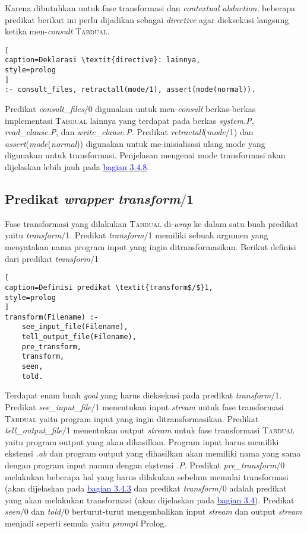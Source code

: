 Karena dibutuhkan untuk fase transformasi dan \textit{contextual abduction}, beberapa predikat berikut ini perlu dijadikan sebagai \textit{directive} agar dieksekusi langsung ketika men-\textit{consult} \textsc{Tabdual}.
\\

\begin{lstlisting}[
caption=Deklarasi \textit{directive}: lainnya,
style=prolog
]
:- consult_files, retractall(mode/1), assert(mode(normal)).
\end{lstlisting}

Predikat \textit{consult\_files$/$}0 digunakan untuk men-\textit{consult} berkas-berkas implementasi \textsc{Tabdual} lainnya yang terdapat pada berkas \textit{system.P}, \textit{read\_clause.P}, dan \textit{write\_clause.P}. Predikat \textit{retractall}(\textit{mode$/$}1) dan \textit{assert}(\textit{mode}(\textit{normal})) digunakan untuk me-inisialisasi ulang mode yang digunakan untuk transformasi. Penjelasan mengenai mode transformasi akan dijelaskan lebih jauh pada \hyperref[subsec:mode]{\textcolor{blue}{bagian 3.4.8}}.

\subsection{Predikat \textit{wrapper} \textit{transform$/$}1}

Fase transformasi yang dilakukan \textsc{Tabdual} di-\textit{wrap} ke dalam satu buah predikat yaitu \textit{transform$/$}1. Predikat \textit{transform$/$}1 memiliki sebuah argumen yang menyatakan nama program input yang ingin ditransformasikan. Berikut definisi dari predikat \textit{transform$/$}1
\\

\begin{lstlisting}[
caption=Definisi predikat \textit{transform$/$}1,
style=prolog
]
transform(Filename) :-
	see_input_file(Filename),
	tell_output_file(Filename),
	pre_transform,
	transform,
	seen,
	told.
\end{lstlisting}

Terdapat enam buah \textit{goal} yang harus dieksekusi pada predikat \textit{transform$/$}1. Predikat \textit{see\_input\_file$/$}1 menentukan input \textit{stream} untuk fase transformasi \textsc{Tabdual} yaitu program input yang ingin ditransformasikan. Predikat \textit{tell\_output\_file$/$}1 menentukan output \textit{stream} untuk fase transformasi \textsc{Tabdual} yaitu program output yang akan dihasilkan. Program input harus memiliki ekstensi \textit{.ab} dan program output yang dihasilkan akan memiliki nama yang sama dengan program input namun dengan ekstensi \textit{.P}. Predikat \textit{pre\_transform$/$}0 melakukan beberapa hal yang harus dilakukan sebelum memulai transformasi (akan dijelaskan pada \hyperref[subsec:pre_transform]{\textcolor{blue}{bagian 3.4.3}} dan predikat \textit{transform$/$}0 adalah predikat yang akan melakukan transformasi (akan dijelaskan pada \hyperref[transform]{\textcolor{blue}{bagian 3.4}}). Predikat \textit{seen$/$}0 dan \textit{told$/$}0 berturut-turut mengembalikan input \textit{stream} dan output \textit{stream} menjadi seperti semula yaitu \textit{prompt} Prolog.


